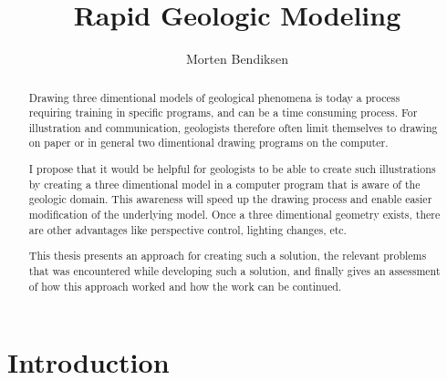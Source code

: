 \documentclass[a4paper,12pt]{report}
\title{Rapid Geologic Modeling}
\author{Morten Bendiksen}
\begin{document}
\maketitle


\clearpage
\begin{abstract}
Drawing three dimentional models of geological phenomena is today a process requiring training in specific programs, and can be a time consuming process. For illustration and communication, geologists therefore often limit themselves to drawing on paper or in general two dimentional drawing programs on the computer.

I propose that it would be helpful for geologists to be able to create such illustrations by creating a three dimentional model in a computer program that is aware of the geologic domain. This awareness will speed up the drawing process and enable easier modification of the underlying model. Once a three dimentional geometry exists, there are other advantages like perspective control, lighting changes, etc.

This thesis presents an approach for creating such a solution, the relevant problems that was encountered while developing such a solution, and finally gives an assessment of how this approach worked and how the work can be continued.
\end{abstract}

\clearpage
\tableofcontents 



\clearpage


\chapter{Introduction}
\label{sec:intro}


% 
% 	
% 	
	
\end{document}
